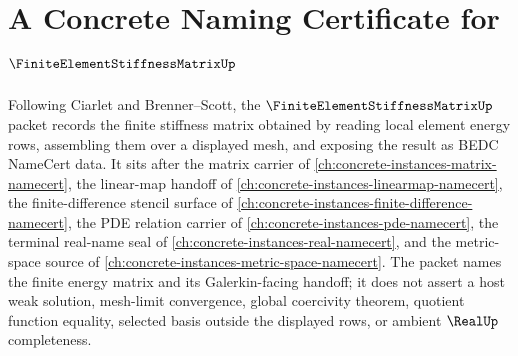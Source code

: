 \chapter{A Concrete Naming Certificate for $\FiniteElementStiffnessMatrixUp$}
\label{ch:concrete-instances-finite-element-stiffness-matrix-namecert}

Following Ciarlet and Brenner--Scott, the $\FiniteElementStiffnessMatrixUp$ packet records the finite stiffness matrix obtained by reading local element energy rows, assembling them over a displayed mesh, and exposing the result as BEDC NameCert data. It sits after the matrix carrier of \autoref{ch:concrete-instances-matrix-namecert}, the linear-map handoff of \autoref{ch:concrete-instances-linearmap-namecert}, the finite-difference stencil surface of \autoref{ch:concrete-instances-finite-difference-namecert}, the PDE relation carrier of \autoref{ch:concrete-instances-pde-namecert}, the terminal real-name seal of \autoref{ch:concrete-instances-real-namecert}, and the metric-space source of \autoref{ch:concrete-instances-metric-space-namecert}. The packet names the finite energy matrix and its Galerkin-facing handoff; it does not assert a host weak solution, mesh-limit convergence, global coercivity theorem, quotient function equality, selected basis outside the displayed rows, or ambient $\RealUp$ completeness.

